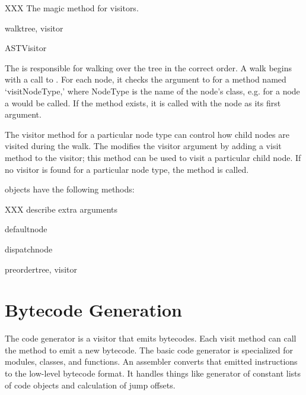 \documentclass{howto}
\begin{document}
XXX The magic  method for visitors.

\begin{funcdesc}{walk}{tree, visitor}
\end{funcdesc}

\begin{classdesc}{ASTVisitor}{}

The  is responsible for walking over the tree in the
correct order.  A walk begins with a call to .  For
each node, it checks the  argument to 
for a method named `visitNodeType,' where NodeType is the name of the
node's class, e.g. for a  node a 
would be called.  If the method exists, it is called with the node as
its first argument.

The visitor method for a particular node type can control how child
nodes are visited during the walk.  The  modifies
the visitor argument by adding a visit method to the visitor; this
method can be used to visit a particular child node.  If no visitor is
found for a particular node type, the  method is
called. 
\end{classdesc}

 objects have the following methods:

XXX describe extra arguments

\begin{methoddesc}{default}{node\optional{, \moreargs}}
\end{methoddesc}

\begin{methoddesc}{dispatch}{node\optional{, \moreargs}}
\end{methoddesc}

\begin{methoddesc}{preorder}{tree, visitor}
\end{methoddesc}


\section{Bytecode Generation}

The code generator is a visitor that emits bytecodes.  Each visit method
can call the  method to emit a new bytecode.  The basic
code generator is specialized for modules, classes, and functions.  An
assembler converts that emitted instructions to the low-level bytecode
format.  It handles things like generator of constant lists of code
objects and calculation of jump offsets.


\end{document}
